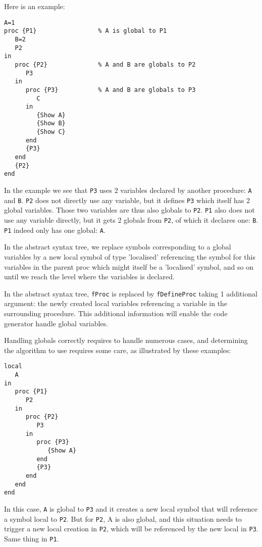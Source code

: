 \documentclass[a4paper]{memoir}
\begin{document}
Here is an example:
\begin{lstlisting}
A=1
proc {P1}                 % A is global to P1
   B=2
   P2
in
   proc {P2}              % A and B are globals to P2
      P3 
   in
      proc {P3}           % A and B are globals to P3
         C
      in
         {Show A}
         {Show B}
         {Show C}
      end
      {P3}
   end
   {P2}
end
\end{lstlisting}


In the example we see that \lstinline!P3! uses 2 variables declared by another procedure: \lstinline!A! and \lstinline!B!. 
\lstinline!P2! does not directly use any variable, but it defines \lstinline!P3! which itself has 2 global variables. Those two variables are thus also globals to \lstinline!P2!.
\lstinline!P1! also does not use any variable directly, but it gets 2 globals from \lstinline!P2!, of which it declares one: \lstinline!B!. \lstinline!P1! indeed only has one global: \lstinline!A!.

In the abstract syntax tree, we replace symbols corresponding to a global variables by a new local symbol of type 'localised' referencing the symbol for this variables in the parent proc which might itself be a 'localised' symbol, and so on until we reach the level where the variables is declared.


In the abstract syntax tree, \lstinline!fProc! is replaced by \lstinline!fDefineProc! taking 1 additional argument: the newly created local variables referencing a variable in the surrounding procedure. This additional information will enable the code generator handle global variables.

Handling globals correctly requires to handle numerous cases, and determining the algorithm to use requires some care, as illustrated by these examples:

\begin{lstlisting}
local
   A
in
   proc {P1}
      P2
   in
      proc {P2}
         P3
      in
         proc {P3}
            {Show A}
         end
         {P3}
      end
   end
end
\end{lstlisting}
In this case, \lstinline!A! is global to \lstinline!P3! and it creates a new local symbol that will reference a symbol local to \lstinline!P2!. But for \lstinline!P2!, A is also global, and this situation needs to trigger a new local creation in \lstinline!P2!, which will be referenced by the new local in \lstinline!P3!. Same thing in \lstinline!P1!.
\end{document}
